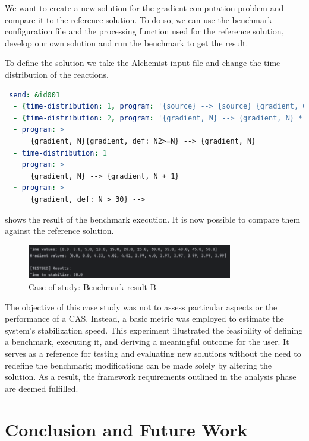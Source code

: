 \documentclass[12pt,a4paper,openright,twoside]{book}
\begin{document}
We want to create a new solution for the gradient computation problem and compare it to the reference solution.
To do so, we can use the benchmark configuration file and the processing function used for the reference solution,
develop our own solution and run the benchmark to get the result.

To define the solution we take the Alchemist input file and change the time distribution of the reactions.

\begin{lstlisting}[language=yaml, caption={Case of study: gradient program B.}]
  _send: &id001
  - {time-distribution: 1, program: '{source} --> {source} {gradient, 0}'}
  - {time-distribution: 2, program: '{gradient, N} --> {gradient, N} *{gradient, N+#D}'}
  - program: >
      {gradient, N}{gradient, def: N2>=N} --> {gradient, N}
  - time-distribution: 1
    program: >
      {gradient, N} --> {gradient, N + 1}
  - program: >
      {gradient, def: N > 30} -->
\end{lstlisting}

 shows the result of the benchmark execution.
It is now possible to compare them against the reference solution.

\begin{figure}[H]
  \centering
  \includegraphics[width=0.8\textwidth]{figures/result-B.png}
  \caption{Case of study: Benchmark result B.}
  \label{fig:result-B}
\end{figure}

The objective of this case study was not to assess particular aspects or the performance of a CAS. 
Instead, a basic metric was employed to estimate the system's stabilization speed.
This experiment illustrated the feasibility of defining a benchmark, executing it, and deriving a meaningful outcome for the user. 
It serves as a reference for testing and evaluating new solutions without the need to redefine the benchmark; modifications can be made solely by altering the solution. 
As a result, the framework requirements outlined in the analysis phase are deemed fulfilled.

\chapter{Conclusion and Future Work}
\end{document}
